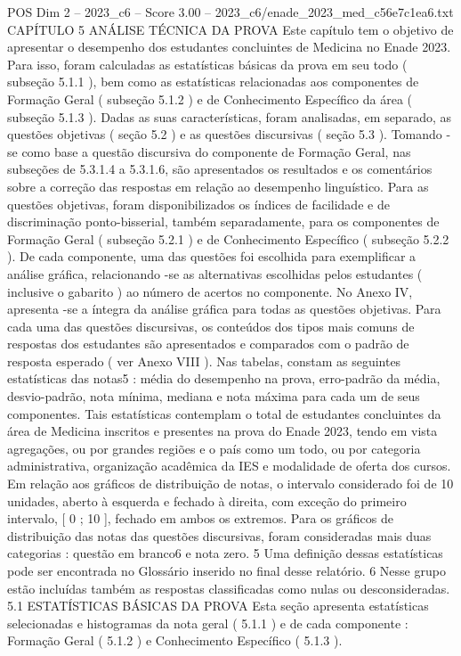 \begin{textsample}{POS Dim 2 – 2023\_c6 – Score 3.00 – 2023\_c6/enade\_2023\_med\_c56e7c1ea6.txt}  \label{ex:f2_pos_165}
CAPÍTULO 5 ANÁLISE TÉCNICA DA PROVA Este capítulo tem o objetivo de apresentar o desempenho dos estudantes concluintes de Medicina no Enade 2023.
Para isso, foram calculadas as estatísticas básicas da prova em seu todo ( subseção 5.1.1 ), bem como as estatísticas relacionadas aos componentes de Formação Geral ( subseção 5.1.2 ) e de Conhecimento Específico da área ( subseção 5.1.3 ).
Dadas as suas características, foram analisadas, em separado, as questões objetivas ( seção 5.2 ) e as questões discursivas ( seção 5.3 ).
Tomando -se como base a questão discursiva do componente de Formação Geral, nas subseções de 5.3.1.4 a 5.3.1.6, são apresentados os resultados e os comentários sobre a correção das respostas em relação ao desempenho linguístico.
Para as questões objetivas, foram disponibilizados os índices de facilidade e de discriminação ponto-bisserial, também separadamente, para os componentes de Formação Geral ( subseção 5.2.1 ) e de Conhecimento Específico ( subseção 5.2.2 ).
De cada componente, uma das questões foi escolhida para exemplificar a análise gráfica, relacionando -se as alternativas escolhidas pelos estudantes ( inclusive o gabarito ) ao número de acertos no componente.
No Anexo IV, apresenta -se a íntegra da análise gráfica para todas as questões objetivas.
Para cada uma das questões discursivas, os conteúdos dos tipos mais comuns de respostas dos estudantes são apresentados e comparados com o padrão de resposta esperado ( ver Anexo VIII ).
Nas tabelas, constam as seguintes estatísticas das notas5 : média do desempenho na prova, erro-padrão da média, desvio-padrão, nota mínima, mediana e nota máxima para cada um de seus componentes.
Tais estatísticas contemplam o total de estudantes concluintes da área de Medicina inscritos e presentes na prova do Enade 2023, tendo em vista agregações, ou por grandes regiões e o país como um todo, ou por categoria administrativa, organização acadêmica da IES e modalidade de oferta dos cursos.
Em relação aos gráficos de distribuição de notas, o intervalo considerado foi de 10 unidades, aberto à esquerda e fechado à direita, com exceção do primeiro intervalo, [ 0 ; 10 ], fechado em ambos os extremos.
Para os gráficos de distribuição das notas das questões discursivas, foram consideradas mais duas categorias : questão em branco6 e nota zero. 5 Uma definição dessas estatísticas pode ser encontrada no Glossário inserido no final desse relatório. 6 Nesse grupo estão incluídas também as respostas classificadas como nulas ou desconsideradas. 5.1 ESTATÍSTICAS BÁSICAS DA PROVA Esta seção apresenta estatísticas selecionadas e histogramas da nota geral ( 5.1.1 ) e de cada componente : Formação Geral ( 5.1.2 ) e Conhecimento Específico ( 5.1.3 ).

\end{textsample}
